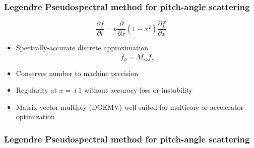 \begin{frame}
  \frametitle{Legendre Pseudospectral method for pitch-angle scattering\\
    }
  \begin{tcolorbox}
    \begin{equation*}
      \frac{\partial f}{\partial t} = \nu \frac{\partial}{\partial x}
      (1-x^2) \frac{\partial f}{\partial x} 
    \end{equation*}
  \end{tcolorbox}
  \begin{itemize}
  \item <1->Spectrally-accurate discrete approximation
    \begin{equation*}
      \bar{f}_k = M_{ik} f_i
    \end{equation*}
  \item<2->Conserves number to machine precision
  \item<3->Regularity at $x=\pm 1$ without accuracy loss or instability
  \item<4->Matrix-vector multiply (DGEMV) well-suited for multicore or accelerator optimization
  \end{itemize}
\end{frame}
\begin{frame}
  \frametitle{Legendre Pseudospectral method for pitch-angle scattering\\
    }
  \begin{center}
    \vskip -1cm
  \end{center}
\end{frame}
